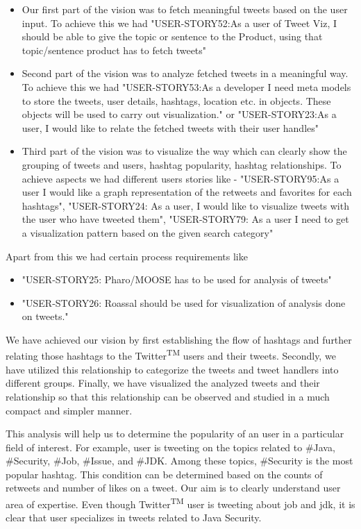 \documentclass[11pt]{article}
\begin{document}
\begin{itemize}
\item Our first part of the vision was to fetch meaningful tweets based on the user input. To achieve this we had "USER-STORY52:As a user of Tweet Viz, I should be able to give the topic or sentence to the Product, using that topic/sentence product has to fetch tweets"

\item Second part of the vision was to analyze fetched tweets in a meaningful way. To achieve this we had "USER-STORY53:As a developer I need meta models to store the tweets, user details, hashtags, location etc. in objects. These objects will be used to carry out visualization." or "USER-STORY23:As a user, I would like to relate the fetched tweets with their user handles"

\item Third part of the vision was to visualize the way which can clearly show the grouping of tweets and users, hashtag popularity, hashtag relationships. To achieve aspects we had different users stories like - "USER-STORY95:As a user I would like a graph representation of the retweets and favorites for each hashtags", "USER-STORY24: As a user, I would like to visualize tweets with the user who have tweeted them", "USER-STORY79: As a user I need to get a visualization pattern based on the given search category"

\end{itemize}

Apart from this we had certain process requirements like

\begin{itemize}
\item "USER-STORY25: Pharo/MOOSE has to be used for analysis of tweets"
\item "USER-STORY26: Roassal should be used for visualization of analysis done on tweets."
\end{itemize}

We have achieved our vision by first establishing the flow of hashtags and further relating those hashtags to the Twitter\textsuperscript{TM} users and their tweets. Secondly, we have utilized this relationship to categorize the tweets and tweet handlers into different groups. Finally, we have visualized the analyzed tweets and their relationship so that this relationship can be observed and studied in a much compact and simpler manner.

This analysis will help us to determine the popularity of an user in a particular field of interest. For example, user is tweeting on the topics related to \#Java, \#Security, \#Job, \#Issue, and \#JDK. Among these topics, \#Security is the most popular hashtag. This condition can be determined based on the counts of retweets and number of likes on a tweet. Our aim is to clearly understand user area of expertise. Even though Twitter\textsuperscript{TM} user is tweeting about job and jdk, it is clear that user specializes in tweets related to Java Security.
\end{document}
